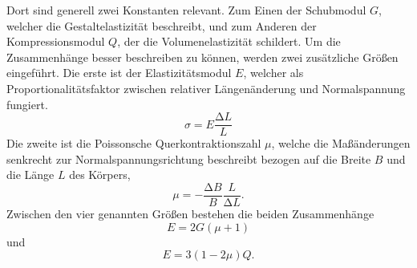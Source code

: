 Dort sind generell zwei Konstanten relevant.
Zum Einen der Schubmodul $G$, welcher die Gestaltelastizität beschreibt, und zum Anderen der Kompressionsmodul $Q$, der die Volumenelastizität schildert.
Um die Zusammenhänge besser beschreiben zu können, werden zwei zusätzliche Größen eingeführt.
Die erste ist der Elastizitätsmodul $E$, welcher als Proportionalitätsfaktor zwischen relativer Längenänderung und Normalspannung fungiert.
\begin{equation}
  \sigma = E \frac{\increment L}{L}
\end{equation}
Die zweite ist die Poissonsche Querkontraktionszahl $\mu$, welche die Maßänderungen senkrecht zur Normalspannungsrichtung beschreibt bezogen auf die Breite $B$ und die Länge $L$ des Körpers,
\begin{equation}
  \mu = - \frac{\increment B}{B} \frac{L}{\increment L}.
\end{equation}
Zwischen den vier genannten Größen bestehen die beiden Zusammenhänge
\begin{equation}
  E = 2G(\mu+1) \label{eqn:1}
\end{equation}
und
\begin{equation}
  E = 3(1-2\mu)Q. \label{eqn:2}    %
\end{equation}
